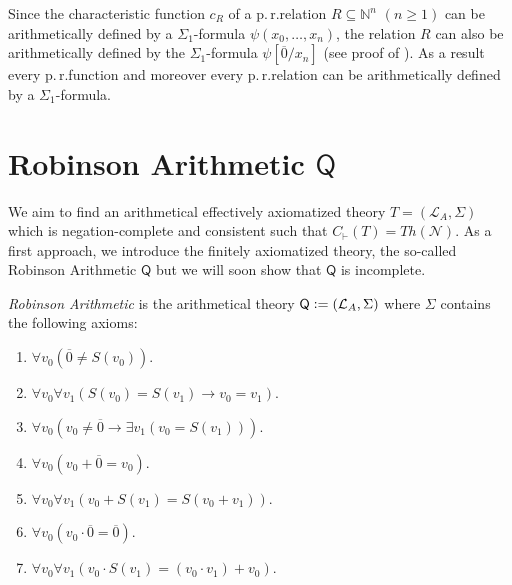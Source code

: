 Since the characteristic function $c_R$ of a p.\,r.\@ relation $R \subseteq \mathbb{N}^n$ $(n\ge 1)$ can be arithmetically defined by a $\Sigma_1$-formula $\psi(x_0, \ldots, x_n)$, the relation $R$ can also be arithmetically defined by the $\Sigma_1$-formula $\psi[\overline{0}/x_n]$ (see proof of ). As a result every p.\,r.\@ function and moreover every p.\,r.\@ relation can be arithmetically defined by a $\Sigma_1$-formula.


\section{Robinson Arithmetic $\mathsf{Q}$}
We aim to find an arithmetical effectively axiomatized theory $T=(\mathcal{L}_A, \Sigma)$ which is negation-complete and consistent such that $C_\vdash(T) =Th(\mathcal{N})$. As a first approach, we introduce the finitely axiomatized theory, the so-called Robinson Arithmetic $\mathsf{Q}$ but we will soon show that $\mathsf{Q}$ is incomplete. 
\begin{dfn}
\textit{Robinson Arithmetic} is the arithmetical theory $\mathsf{Q} \vcentcolon= (\mathcal{L}_A,\Sigma)$ where $\Sigma$ contains the following axioms:
\begin{enumerate}[label=({Q\arabic*})]
\item $\forall v_0 (\overline{0} \neq S (v_0))$.
\item $\forall v_0 \forall v_1  ( S(v_0) = S(v_1) \rightarrow v_0 = v_1)$.
\item $\forall v_0  ( v_0 \neq \overline{0} \rightarrow \exists v_1  (v_0 = S(v_1)))$.
\item $\forall v_0  ( v_0 + \overline{0} = v_0)$.
\item $\forall v_0 \forall v_1 (v_0 + S(v_1) = S(v_0+v_1))$.
\item $\forall v_0 ( v_0 \cdot \overline{0} = \overline{0})$.
\item $\forall v_0 \forall v_1 ( v_0 \cdot S (v_1) = (v_0 \cdot v_1 ) + v_0) $.
\end{enumerate}
\end{dfn} 

